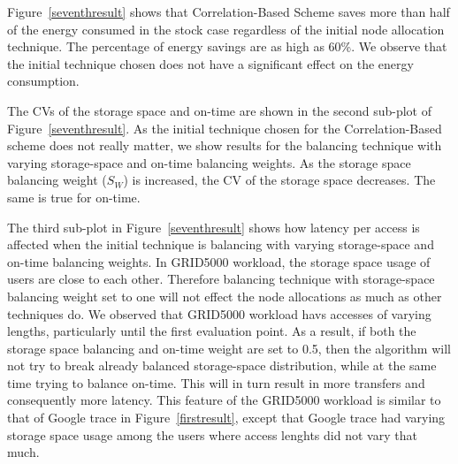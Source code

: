 Figure~\ref{seventhresult} shows that Correlation-Based Scheme saves more than half of the energy consumed
in the stock case regardless of the initial node allocation technique. The percentage of energy savings
are as high as 60\%. We observe that the initial technique chosen does not have a significant effect on
the energy consumption.

The CVs of the storage space and on-time are shown in the second sub-plot of Figure~\ref{seventhresult}.
As the initial technique chosen for the Correlation-Based scheme does not really matter, we show
results for the balancing technique with varying storage-space and on-time balancing weights. As the
storage space balancing weight ($S_W$) is increased, the CV of the storage space
decreases. The same is true for on-time.

The third sub-plot in Figure~\ref{seventhresult} shows how latency per access is affected when the initial
technique is balancing with varying storage-space and on-time balancing weights. In GRID5000 workload, the
storage space usage of users are close to each other. Therefore balancing technique with storage-space
balancing weight set to one will not effect the node allocations as much as other techniques do. We observed
that GRID5000 workload havs accesses of varying lengths, particularly
until the first evaluation point. As a result, if both the storage space balancing and on-time weight are set
to 0.5, then the algorithm will not try to break already balanced storage-space distribution, while at the
same time trying to balance on-time. This will in turn result in more transfers and consequently more latency.
This feature of the GRID5000 workload is similar to that of Google trace in Figure~\ref{firstresult}, except
that Google trace had varying storage space usage among the users where access lenghts did not vary that much.


